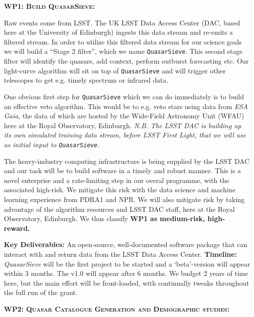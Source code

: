 \medskip \medskip
\smallskip
\smallskip
\noindent
\textbf{\textsc{WP1: Build QuasarSieve:}} 

\smallskip
\smallskip
\noindent
Raw events come from LSST. The UK LSST Data Access Center (DAC, based
here at the University of Edinburgh) ingests this data stream and
re-emits a filtered stream. In order to utilize this filtered data
stream for our science goals we will build a ``Stage 2 filter'', which
we name {\tt QuasarSieve}.  This second stage filter will identify the
quasars, add context, perform outburst forecasting etc.  Our
light-curve algorithm will sit on top of {\tt QuasarSieve} and will
trigger other telescopes to get e.g. timely spectrum or infrared data.

\smallskip
\smallskip
\noindent
One obvious first step for {\tt QuasarSieve} which we can do
immediately is to build an effective veto algorithm. This would be to
e.g. veto stars using data from {\it ESA Gaia}, the data of which are
hosted by the Wide-Field Astronomy Unit (WFAU) here at the Royal
Observatory, Edinburgh. {\it N.B. The LSST DAC is building up its own 
simulated training data stream, before LSST First Light, that we will 
use as initial input to  {\tt QuasarSieve}.}

\smallskip
\smallskip
\noindent
The heavy-industry computing infrastructure is being supplied by the
LSST DAC and our task will be to build software in a timely and robust
manner.  This is a novel enterprise and a rate-limiting step in our
overal programme, with the associated high-risk.  We mitigate this
risk with the data science and machine learning experience from PDRA1 
and NPR.  We will also mitigate risk by taking advantage of
the algorithm resources and LSST DAC staff, here at the Royal
Observatory, Edinburgh.  We thus classify {\bf WP1 as medium-risk,
high-reward.}

\smallskip
\smallskip
\noindent
{\bf Key Deliverables:} An open-source, well-documented software
package that can interact with and return data from the LSST Data
Access Center. {\bf Timeline:} {\it QuasarSieve} will be the first
project to be started and a `beta'-version will appear within 3
months.  The v1.0 will appear after 6 months. We budget 2 years of
time here, but the main effort will be front-loaded, with continually
tweaks throughout the full run of the grant.


\medskip 
\medskip
\smallskip
\smallskip
\noindent
\textbf{\textsc{WP2: Quasar Catalogue Generation and Demographic studies:}}  

